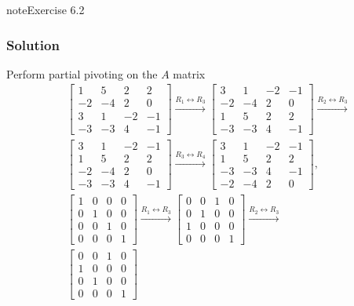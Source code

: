 \documentclass[letterpaper,10pt,english]{jupyterBook}
\begin{document}
\begin{sphinxadmonition}{note}{Exercise 6.2}
\subsubsection*{Solution}

\sphinxAtStartPar
Perform partial pivoting on the \(A\) matrix
\begin{align*}
    & \left[\begin{matrix}1 & 5 & 2 & 2\\-2 & -4 & 2 & 0\\3 & 1 & -2 & -1\\-3 & -3 & 4 & -1\end{matrix}\right]
    \xrightarrow{R_{1} \leftrightarrow R_{3}}
    \left[\begin{matrix}3 & 1 & -2 & -1\\-2 & -4 & 2 & 0\\1 & 5 & 2 & 2\\-3 & -3 & 4 & -1\end{matrix}\right] 
    \xrightarrow{R_{2} \leftrightarrow R_{3}}\\
    &
    \left[\begin{matrix}3 & 1 & -2 & -1\\1 & 5 & 2 & 2\\-2 & -4 & 2 & 0\\-3 & -3 & 4 & -1\end{matrix}\right]
    \xrightarrow{R_{3} \leftrightarrow R_{4}}
    \left[\begin{matrix}3 & 1 & -2 & -1\\1 & 5 & 2 & 2\\-3 & -3 & 4 & -1\\-2 & -4 & 2 & 0\end{matrix}\right]
    , \\
    & \left[\begin{matrix}1 & 0 & 0 & 0\\0 & 1 & 0 & 0\\0 & 0 & 1 & 0\\0 & 0 & 0 & 1\end{matrix}\right]
    \xrightarrow{R_{1} \leftrightarrow R_{3}}
    \left[\begin{matrix}0 & 0 & 1 & 0\\0 & 1 & 0 & 0\\1 & 0 & 0 & 0\\0 & 0 & 0 & 1\end{matrix}\right]
    \xrightarrow{R_{2} \leftrightarrow R_{3}}\\
    &
    \left[\begin{matrix}0 & 0 & 1 & 0\\1 & 0 & 0 & 0\\0 & 1 & 0 & 0\\0 & 0 & 0 & 1\end{matrix}\right]

\end{align*}
\end{sphinxadmonition}
\end{document}
